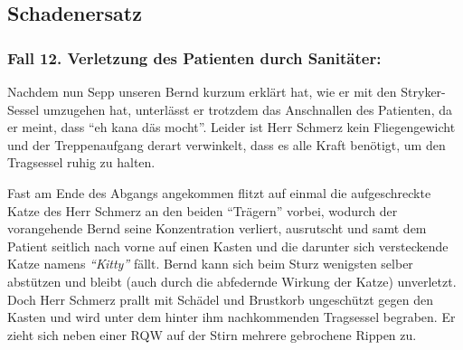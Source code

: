
\subsection{Schadenersatz}
\label{topic:schadenersatz}

\subsubsection{Fall 12. Verletzung des Patienten durch
Sanitäter:}
\label{topic:jus-langer-dienst-fall-12}



{Nachdem nun Sepp unseren Bernd kurzum erklärt hat, wie er
mit den Stryker{\texttrademark}-Sessel umzugehen hat,
unterlässt er trotzdem das Anschnallen des Patienten, da er
meint, dass \enquote{eh kana däs mocht}. Leider ist Herr
Schmerz kein Fliegengewicht und der Treppenaufgang 
derart verwinkelt, dass es alle Kraft benötigt, um den
Tragsessel ruhig zu halten.

Fast am Ende des Abgangs angekommen flitzt auf einmal die
aufgeschreckte Katze des Herr Schmerz an den beiden
\enquote{Trägern} vorbei, wodurch der vorangehende Bernd
seine Konzentration verliert, ausrutscht und samt dem
Patient seitlich nach vorne auf einen Kasten und die
darunter sich versteckende Katze namens
\emph{\enquote{Kitty}} %
fällt. Bernd kann sich beim Sturz wenigsten selber abstützen
und bleibt (auch durch die abfedernde Wirkung der Katze)
unverletzt. Doch Herr Schmerz prallt mit Schädel und
Brustkorb ungeschützt gegen den Kasten und wird unter dem
hinter ihm nachkommenden Tragsessel begraben. Er zieht sich
neben einer RQW auf
der Stirn mehrere gebrochene Rippen zu.
}

